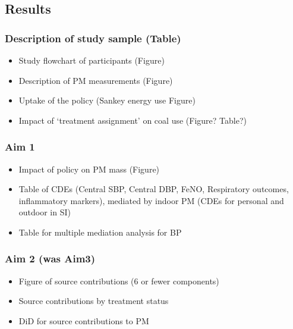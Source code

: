 \documentclass[
  letterpaper,
  DIV=11,
  numbers=noendperiod]{scrartcl}
\providecommand{\tightlist}{%
  \setlength{\itemsep}{0pt}\setlength{\parskip}{0pt}}\usepackage{longtable,booktabs,array}
\begin{document}
\hypertarget{results}{%
\subsection{Results}\label{results}}

\hypertarget{description-of-study-sample-table}{%
\subsubsection{Description of study sample
(Table)}\label{description-of-study-sample-table}}

\begin{itemize}
\tightlist
\item
  Study flowchart of participants (Figure)
\item
  Description of PM measurements (Figure)
\item
  Uptake of the policy (Sankey energy use Figure)
\item
  Impact of `treatment assignment' on coal use (Figure? Table?)
\end{itemize}

\hypertarget{aim-1}{%
\subsubsection{Aim 1}\label{aim-1}}

\begin{itemize}
\tightlist
\item
  Impact of policy on PM mass (Figure)
\item
  Table of CDEs (Central SBP, Central DBP, FeNO, Respiratory outcomes,
  inflammatory markers), mediated by indoor PM (CDEs for personal and
  outdoor in SI)
\item
  Table for multiple mediation analysis for BP
\end{itemize}

\hypertarget{aim-2-was-aim3}{%
\subsubsection{Aim 2 (was Aim3)}\label{aim-2-was-aim3}}

\begin{itemize}
\tightlist
\item
  Figure of source contributions (6 or fewer components)
\item
  Source contributions by treatment status
\item
  DiD for source contributions to PM
\end{itemize}
\end{document}
